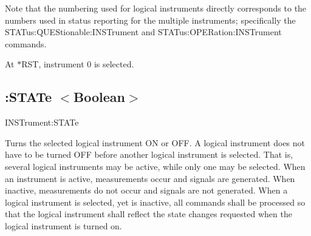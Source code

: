 Note that the numbering used for logical instruments directly corresponds to the numbers used in status reporting for the multiple instruments; specifically the S\-T\-A\-Tus\-:\-Q\-U\-E\-Stionable\-:I\-N\-S\-Trument and S\-T\-A\-Tus\-:\-O\-P\-E\-Ration\-:I\-N\-S\-Trument commands.

At $\ast$\-R\-S\-T, instrument 0 is selected.\hypertarget{a00002_inststat}{}\subsection{\-:\-S\-T\-A\-Te $<$\-Boolean$>$}\label{a00002_inststat}
{\ttfamily I\-N\-S\-Trument\-:S\-T\-A\-Te}\par
 Turns the selected logical instrument O\-N or O\-F\-F. A logical instrument does not have to be turned O\-F\-F before another logical instrument is selected. That is, several logical instruments may be active, while only one may be selected. When an instrument is active, measurements occur and signals are generated. When inactive, measurements do not occur and signals are not generated. When a logical instrument is selected, yet is inactive, all commands shall be processed so that the logical instrument shall reflect the state changes requested when the logical instrument is turned on.

